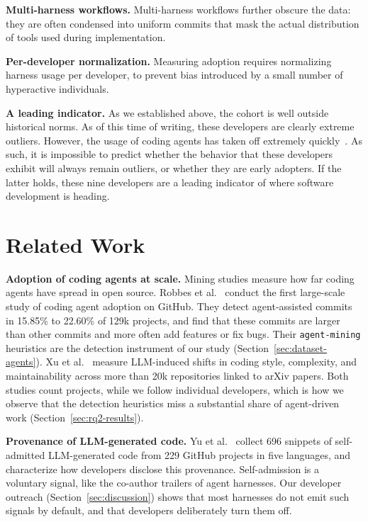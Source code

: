 \documentclass[smallextended]{svjour3}
\begin{document}
\textbf{Multi-harness workflows.} Multi-harness workflows further obscure the data: they are often condensed into uniform commits that mask the actual distribution of tools used during implementation.

\textbf{Per-developer normalization.} Measuring adoption requires normalizing harness usage per developer, to prevent bias introduced by a small number of hyperactive individuals.

\textbf{A leading indicator.} As we established above, the cohort is well outside historical norms. As of this time of writing, these developers are clearly extreme outliers. However, the usage of coding agents has taken off extremely quickly~\cite{Robbes2026}. As such, it is impossible to predict whether the behavior that these developers exhibit will always remain outliers, or whether they are early adopters.
If the latter holds, these nine developers are a leading indicator of where software development is heading.


\section{Related Work}
\label{sec:related}

\textbf{Adoption of coding agents at scale.}
Mining studies measure how far coding agents have spread in open source.
Robbes et al.~\cite{Robbes2026} conduct the first large-scale study of coding agent adoption on GitHub. They detect agent-assisted commits in 15.85\% to 22.60\% of 129k projects, and find that these commits are larger than other commits and more often add features or fix bugs.
Their \texttt{agent-mining} heuristics are the detection instrument of our study (Section~\ref{sec:dataset-agents}).
Xu et al.~\cite{Xu2026} measure LLM-induced shifts in coding style, complexity, and maintainability across more than 20k repositories linked to arXiv papers.
Both studies count projects, while we follow individual developers, which is how we observe that the detection heuristics miss a substantial share of agent-driven work (Section~\ref{sec:rq2-results}).

\textbf{Provenance of LLM-generated code.}
Yu et al.~\cite{Yu2024} collect 696 snippets of self-admitted LLM-generated code from 229 GitHub projects in five languages, and characterize how developers disclose this provenance.
Self-admission is a voluntary signal, like the co-author trailers of agent harnesses.
Our developer outreach (Section~\ref{sec:discussion}) shows that most harnesses do not emit such signals by default, and that developers deliberately turn them off.
\end{document}
